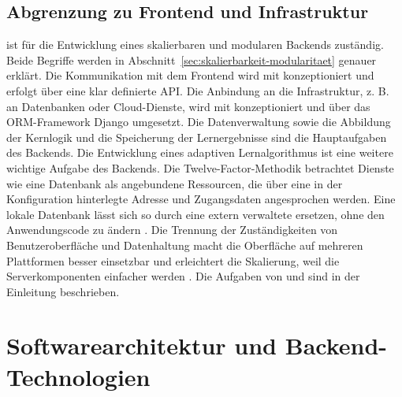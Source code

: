\subsection{Abgrenzung zu Frontend und Infrastruktur}
\Luca ist für die Entwicklung eines skalierbaren und modularen Backends zuständig. Beide Begriffe werden in Abschnitt~\ref{sec:skalierbarkeit-modularitaet} genauer erklärt.
Die Kommunikation mit dem Frontend wird mit \Jakob konzeptioniert und erfolgt über eine klar definierte API.
Die Anbindung an die Infrastruktur, z. B. an Datenbanken oder Cloud-Dienste, wird mit \Jai konzeptioniert und über das ORM-Framework Django umgesetzt.
Die Datenverwaltung sowie die Abbildung der Kernlogik und die Speicherung der Lernergebnisse sind die Hauptaufgaben des Backends.
Die Entwicklung eines adaptiven Lernalgorithmus ist eine weitere wichtige Aufgabe des Backends.
Die Twelve-Factor-Methodik betrachtet Dienste wie eine Datenbank als
angebundene Ressourcen, die über eine in der Konfiguration hinterlegte Adresse
und Zugangsdaten angesprochen werden. Eine lokale Datenbank lässt sich so
durch eine extern verwaltete ersetzen, ohne den Anwendungscode zu ändern
\parencite[vgl.][]{wiggins12factor}.
Die Trennung der Zuständigkeiten von Benutzeroberfläche und Datenhaltung
macht die Oberfläche auf mehreren Plattformen besser einsetzbar und erleichtert
die Skalierung, weil die Serverkomponenten einfacher werden
\parencite[vgl.][Abschn.~5.1.2]{fielding2000}.
Die Aufgaben von \Jakob und \Jai sind in der Einleitung beschrieben.


\section{Softwarearchitektur und Backend-Technologien}
\label{sec:architektur}


